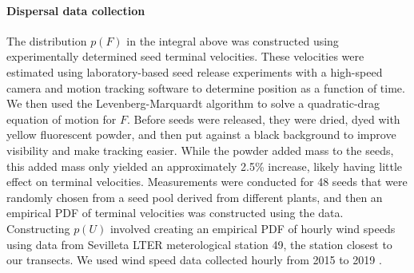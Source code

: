 \documentclass[11pt]{article}\usepackage[]{graphicx}\usepackage[usenames,dvipsnames]{xcolor}
\begin{document}
\paragraph{Dispersal data collection}
The distribution $p(F)$ in the integral above was constructed using experimentally determined seed terminal velocities.
These velocities were estimated using laboratory-based seed release experiments with a high-speed camera and motion tracking software to determine position as a function of time.
We then used the Levenberg-Marquardt algorithm to solve a quadratic-drag equation of motion for $F$. 
Before seeds were released, they were dried, dyed with yellow fluorescent powder, and then put against a black background to improve visibility and make tracking easier.
While the powder added mass to the seeds, this added mass only yielded an approximately 2.5\% increase, likely having little effect on terminal velocities.
Measurements were conducted for 48 seeds that were randomly chosen from a seed pool derived from different plants, and then an empirical PDF of terminal velocities was constructed using the data.
Constructing $p(U)$ involved creating an empirical PDF of hourly wind speeds using data from Sevilleta LTER meterological station 49, the station closest to our transects.
We used wind speed data collected hourly from 2015 to 2019 \citep{SEVmet}.



\end{document}
